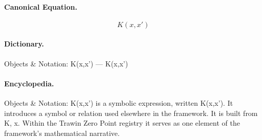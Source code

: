 \paragraph{Canonical Equation.}
\[
K(x,x')
\]

\paragraph{Dictionary.}
Objects \& Notation: K(x,x') — K(x,x')

\paragraph{Encyclopedia.}
Objects \& Notation: K(x,x') is a symbolic expression, written K(x,x'). It introduces a symbol or relation used elsewhere in the framework. It is built from K, x. Within the Trawin Zero Point registry it serves as one element of the framework's mathematical narrative.
